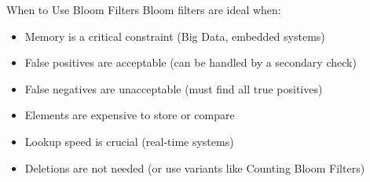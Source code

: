 \begin{frame}{When to Use Bloom Filters}
  Bloom filters are ideal when:

  \begin{itemize}
    \item Memory is a critical constraint (Big Data, embedded systems)
    \item False positives are acceptable (can be handled by a secondary check)
    \item False negatives are unacceptable (must find all true positives)
    \item Elements are expensive to store or compare
    \item Lookup speed is crucial (real-time systems)
    \item Deletions are not needed (or use variants like Counting Bloom Filters)
  \end{itemize}
\end{frame}